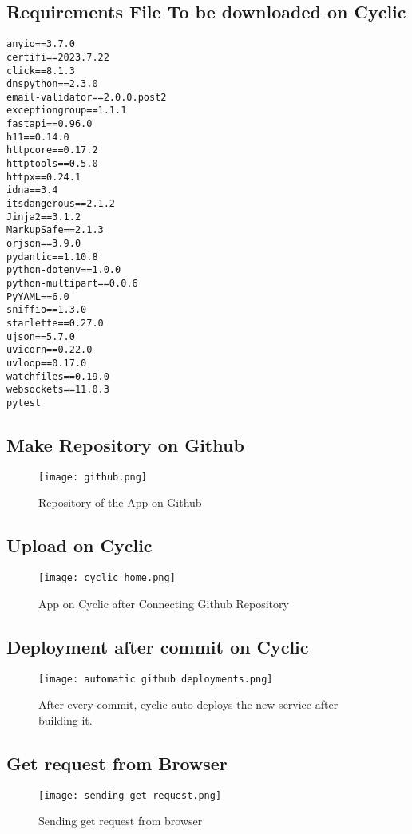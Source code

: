 \documentclass[11pt]{article}
\begin{document}
\subsection{Requirements File To be downloaded on Cyclic}
\begin{lstlisting}
anyio==3.7.0
certifi==2023.7.22
click==8.1.3
dnspython==2.3.0
email-validator==2.0.0.post2
exceptiongroup==1.1.1
fastapi==0.96.0
h11==0.14.0
httpcore==0.17.2
httptools==0.5.0
httpx==0.24.1
idna==3.4
itsdangerous==2.1.2
Jinja2==3.1.2
MarkupSafe==2.1.3
orjson==3.9.0
pydantic==1.10.8
python-dotenv==1.0.0
python-multipart==0.0.6
PyYAML==6.0
sniffio==1.3.0
starlette==0.27.0
ujson==5.7.0
uvicorn==0.22.0
uvloop==0.17.0
watchfiles==0.19.0
websockets==11.0.3
pytest

\end{lstlisting}

\subsection{Make Repository on Github}
\begin{figure}[H]
    \centering
    \texttt{[image: github.png]}
    \caption{Repository of the App on Github}
\end{figure}
\subsection{Upload on Cyclic}
\begin{figure}[H]
    \centering
    \texttt{[image: cyclic home.png]}
    \caption{App on Cyclic after Connecting Github Repository}
\end{figure}
\subsection{Deployment after commit on Cyclic}
\begin{figure}[H]
    \centering
    \texttt{[image: automatic github deployments.png]}
    \caption{After every commit, cyclic auto deploys the new service after building it. }
\end{figure}
\subsection{Get request from Browser}
\begin{figure}[H]
    \centering
    \texttt{[image: sending get request.png]}
    \caption{Sending get request from browser}
\end{figure}
\end{document}
